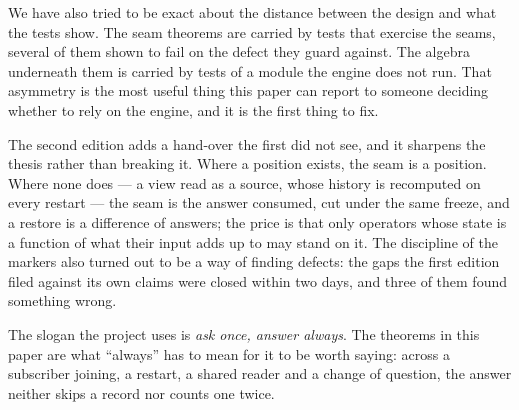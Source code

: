 \documentclass[11pt,a4paper]{article}
\renewcommand{\_}{\oldunderscore\allowbreak}
\begin{document}
We have also tried to be exact about the distance between the design and what the tests show. The seam
theorems are carried by tests that exercise the seams, several of them shown to fail on the defect they
guard against. The algebra underneath them is carried by tests of a module the engine does not run.
That asymmetry is the most useful thing this paper can report to someone deciding whether to rely on
the engine, and it is the first thing to fix.

The second edition adds a hand-over the first did not see, and it sharpens the thesis rather than
breaking it. Where a position exists, the seam is a position. Where none does --- a view read as a
source, whose history is recomputed on every restart --- the seam is the answer consumed, cut under the
same freeze, and a restore is a difference of answers; the price is that only operators whose state is a
function of what their input adds up to may stand on it. The discipline of the markers also turned out
to be a way of finding defects: the gaps the first edition filed against its own claims were closed
within two days, and three of them found something wrong.

The slogan the project uses is \emph{ask once, answer always}. The theorems in this paper are what
``always'' has to mean for it to be worth saying: across a subscriber joining, a restart, a shared
reader and a change of question, the answer neither skips a record nor counts one twice.
\end{document}
